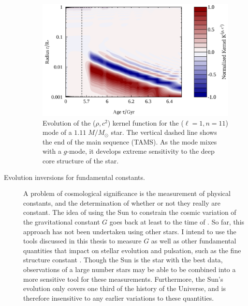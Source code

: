 \begin{description}
\begin{figure}
    \centering
    \hspace*{-1.35cm}\includegraphics[width=1.2\linewidth]{ch1_introduction/figs/prospective/kernel_evolution-rho-c2-l1_n11.png}
    \caption[Kernel function evolution]{Evolution of the (${\rho, c^2}$) kernel function for the (${\ell=1}, {n=11}$) mode of a ${1.11\; M/M_\odot}$ star. 
        The vertical dashed line shows the end of the main sequence (TAMS). 
        As the mode mixes with a $g$-mode, it develops extreme sensitivity to the deep core structure of the star. 
        \label{fig:kernel-evol}}
\end{figure}
    
    
    \item[Evolution inversions for fundamental constants.]
    A problem of cosmological significance is the measurement of physical constants, and the determination of whether or not they really are constant. 
    The idea of using the Sun to constrain the cosmic variation of the gravitational constant $G$ goes back at least to the time of \citet{Dirac199}. 
    So far, this approach has not been undertaken using other stars. 
    I intend to use the tools discussed in this thesis to measure $G$ as well as other fundamental quantities that impact on stellar evolution and pulsation, such as the fine structure constant \citep[e.g.,][]{2008JCAP...08..010A, 2010AIPC.1269...21C}. 
    Though the Sun is the star with the best data, observations of a large number stars may be able to be combined into a more sensitive tool for these measurements. 
    Furthermore, the Sun's evolution only covers one third of the history of the Universe, and is therefore insensitive to any earlier variations to these quantities. 
\end{description}

